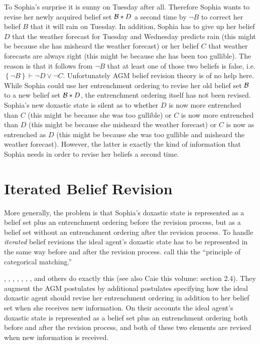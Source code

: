 To Sophia's surprise it is sunny on Tuesday after all. Therefore Sophia wants to revise her newly acquired belief set $\begin{cal}B\end{cal}*D$ a second time by $\neg B$ to correct her belief $B$ that it will rain on Tuesday. In addition, Sophia has to give up her belief $D$ that the weather forecast for Tuesday and Wednesday predicts rain (this might be because she has misheard the weather forecast) or her belief $C$ that weather forecasts are always right (this might be because she has been too gullible). The reason is that it follows from $\neg B$ that at least one of those two beliefs is false, i.e. $\left\{\neg B\right\}\vdash\neg D\vee\neg C$. Unfortunately AGM belief revision theory is of no help here. While Sophia could use her entrenchment ordering to revise her old belief set $\cal B$ to a new belief set $\begin{cal}B\end{cal}*D$, the entrenchment ordering itself has not been revised. Sophia's new doxastic state is silent as to whether $D$ is now more entrenched than $C$ (this might be because she was too gullible) or $C$ is now more entrenched than $D$ (this might be because she misheard the weather forecast) or $C$ is now as entrenched as $D$ (this might be because she was too gullible and misheard the weather forecast). However, the latter is exactly the kind of information that Sophia needs in order to revise her beliefs a second time.


\section{Iterated Belief Revision}

More generally, the problem is that Sophia's doxastic state is represented as a belief set plus an entrenchment ordering before the revision process, but as a belief set without an entrenchment ordering after the revision process. To handle \emph{iterated} belief revisions the ideal agent's doxastic state has to be represented in the same way before and after the revision process. \citet[37]{gr95} call this the ``principle of categorical matching.''

\citet{n94}, \citet{b96}, \citet{dp97}, \citet{s98}, \citet{f00}, \citet{r03}, \citet{r06}, and others do exactly this (see also Caie this volume: section 2.4). They augment the AGM postulates by additional postulates specifying how the ideal doxastic agent should revise her entrenchment ordering in addition to her belief set when she receives new information. On their accounts the ideal agent's doxastic state is represented as a belief set plus an entrenchment ordering both before and after the revision process, and both of these two elements are revised when new information is received.

